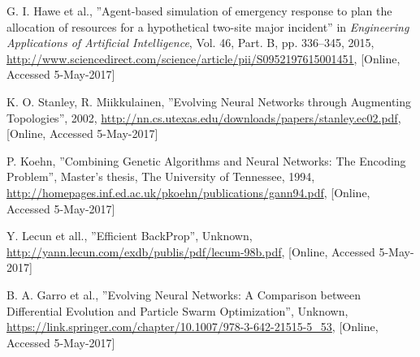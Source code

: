 \begin{thebibliography}{9}
G. I. Hawe et al., ''Agent-based simulation of emergency response to plan the allocation of resources for a hypothetical two-site major incident'' in \textit{Engineering Applications of Artificial Intelligence}, Vol. 46, Part. B, pp. 336–345, 2015, \url{http://www.sciencedirect.com/science/article/pii/S0952197615001451}, [Online, Accessed 5-May-2017]

K. O. Stanley, R. Miikkulainen, ''Evolving Neural Networks through Augmenting Topologies'', 2002, \url{http://nn.cs.utexas.edu/downloads/papers/stanley.ec02.pdf}, [Online, Accessed 5-May-2017]

P. Koehn, ''Combining Genetic Algorithms and Neural Networks: The Encoding Problem'', Master's thesis, The University of Tennessee, 1994, \url{http://homepages.inf.ed.ac.uk/pkoehn/publications/gann94.pdf}, [Online, Accessed 5-May-2017]

Y. Lecun et all., ''Efficient BackProp'', Unknown, \url{http://yann.lecun.com/exdb/publis/pdf/lecum-98b.pdf}, [Online, Accessed 5-May-2017]

B. A. Garro et al., ''Evolving Neural Networks: A Comparison between Differential Evolution and Particle Swarm Optimization'', Unknown, \url{https://link.springer.com/chapter/10.1007/978-3-642-21515-5_53}, [Online, Accessed 5-May-2017]


\end{thebibliography}

